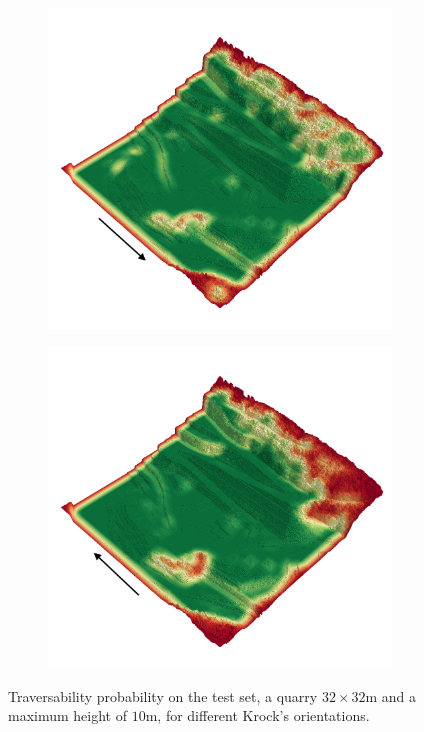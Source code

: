 \documentclass[../document.tex]{subfiles}
\begin{document}
\begin{figure} [htbp]
\begin{subfigure}[b]{0.45\textwidth}
\end{subfigure}
\begin{subfigure}[b]{0.45\textwidth}
  \includegraphics[width=\linewidth]{../img/4/traversability/quarry/-0.png}
\end{subfigure}
\begin{subfigure}[b]{0.45\textwidth}
    \includegraphics[width=\linewidth]{../img/4/traversability/quarry/-180.png}  
\end{subfigure}
\caption{Traversability probability on the test set, a quarry $32\times 32$m and a maximum height of $10$m, for different Krock's orientations. }
\label{fig : quarry-trav}
\end{figure}
\end{document}
